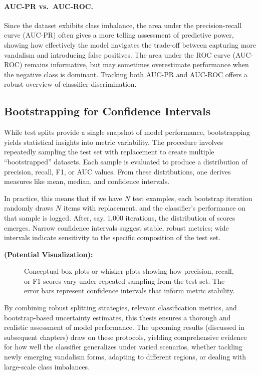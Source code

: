 \documentclass[
    13pt, %
    a4paper, %
    twoside, 
    DIV14, %
    listof=totoc, %
    bibliography=totoc, %
    index=totoc, %
    headsepline
]{scrreprt}
\begin{document}
\paragraph{AUC-PR vs.\ AUC-ROC.}
Since the dataset exhibits class imbalance, the area under the precision-recall curve (AUC-PR) often gives a more telling assessment of predictive power, showing how effectively the model navigates the trade-off between capturing more vandalism and introducing false positives. The area under the ROC curve (AUC-ROC) remains informative, but may sometimes overestimate performance when the negative class is dominant. Tracking both AUC-PR and AUC-ROC offers a robust overview of classifier discrimination.

\subsection{Bootstrapping for Confidence Intervals}
\label{sec:bootstrapping_for_ci}

While test splits provide a single snapshot of model performance, bootstrapping yields statistical insights into metric variability. The procedure involves repeatedly sampling the test set with replacement to create multiple “bootstrapped” datasets. Each sample is evaluated to produce a distribution of precision, recall, F1, or AUC values. From these distributions, one derives measures like mean, median, and confidence intervals.

In practice, this means that if we have \(N\) test examples, each bootstrap iteration randomly draws \(N\) items with replacement, and the classifier’s performance on that sample is logged. After, say, 1{,}000 iterations, the distribution of scores emerges. Narrow confidence intervals suggest stable, robust metrics; wide intervals indicate sensitivity to the specific composition of the test set. 

\noindent
\textbf{(Potential Visualization):}  
\begin{figure}[htbp]
    \centering
    \caption{Conceptual box plots or whisker plots showing how precision, recall, or F1-scores vary under repeated sampling from the test set. The error bars represent confidence intervals that inform metric stability.}
    \label{fig:bootstrap_plots}
\end{figure}

By combining robust splitting strategies, relevant classification metrics, and bootstrap-based uncertainty estimates, this thesis ensures a thorough and realistic assessment of model performance. The upcoming results (discussed in subsequent chapters) draw on these protocols, yielding comprehensive evidence for how well the classifier generalizes under varied scenarios, whether tackling newly emerging vandalism forms, adapting to different regions, or dealing with large-scale class imbalances.
\end{document}
